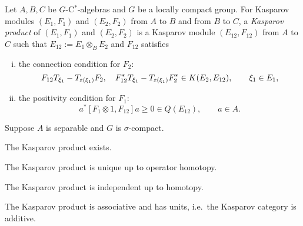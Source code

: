 \documentclass{../../large}
\begin{document}
\begin{prb}
Let $A,B,C$ be $G$-C$^*$-algebras and $G$ be a locally compact group.
For Kasparov modules $(E_1,F_1)$ and $(E_2,F_2)$ from $A$ to $B$ and from $B$ to $C$, a \emph{Kasparov product} of $(E_1,F_1)$ and $(E_2,F_2)$ is a Kasparov module $(E_{12},F_{12})$ from $A$ to $C$ such that $E_{12}:=E_1\otimes_BE_2$ and $F_{12}$ satisfies
\begin{enumerate}[(i)]
\item the connection condition for $F_2$:
\[F_{12}T_{\xi_1}-T_{\varepsilon(\xi_1)}F_2,\quad F_{12}^*T_{\xi_1}-T_{\varepsilon(\xi_1)}F_2^*\in K(E_2,E_{12}),\qquad\xi_1\in E_1,\]
\item the positivity condition for $F_1$:
\[a^*[F_1\otimes1,F_{12}]a\ge0\in Q(E_{12}),\qquad a\in A.\]
\end{enumerate}

Suppose $A$ is separable and $G$ is $\sigma$-compact.
\begin{parts}
\item The Kasparov product exists.
\item The Kasparov product is unique up to operator homotopy.
\item The Kasparov product is independent up to homotopy.
\item The Kasparov product is associative and has units, i.e.~the Kasparov category is additive.
\end{parts}
\end{prb}
\end{document}
